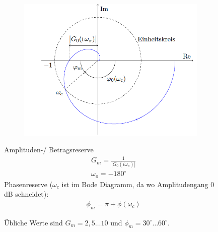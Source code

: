 \begin{tcolorbox}[colback=white!10!white,
    colframe=green!30!black,
    title=Nyquist]
    \begin{figure}[H]
        \begin{subfigure}{0.5\linewidth}
            \includegraphics[width=\linewidth]{images/nyquist}
            \label{fig:nyquist}
        \end{subfigure}
        \begin{minipage}{0.45\linewidth}
            Amplituden-/ Betragsreserve 
            \begin{align*}
            &G_m = \frac{1}{|G_0(i\omega_\pi)|}\\
            & \omega_\pi = -180^{\circ}
            \end{align*}
            Phasenreserve ($\omega_c$ ist im Bode Diagramm, da wo Amplitudengang $0$dB schneidet):
            \begin{align*}
            &\phi_m = \pi + \phi(\omega_c)
            \end{align*}
        \end{minipage}
        Übliche Werte sind $G_m = 2,5 \ldots  10$ und $\phi_m = 30^{\circ} \dots 60^{\circ}  $. 
        

\end{figure}
\end{tcolorbox}
